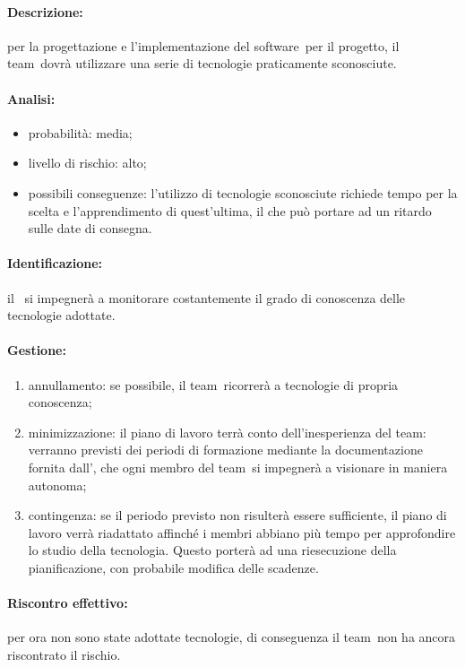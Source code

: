 \documentclass[../PianoProgetto.tex]{subfiles}
\begin{document}
	\paragraph*{Descrizione:} per la progettazione e l'implementazione del software\g\ per il progetto, il team\g\ dovrà utilizzare una serie di tecnologie praticamente sconosciute.
	
	\paragraph*{Analisi:}
	\begin{itemize}
		\item probabilità: media;
		\item livello di rischio: alto;
		\item possibili conseguenze: l'utilizzo di tecnologie sconosciute richiede tempo per la scelta e l'apprendimento di quest'ultima, il che può portare ad un ritardo sulle date di consegna.
	\end{itemize}
	
	\paragraph*{Identificazione:} il \responsabilediprogetto\ si impegnerà a monitorare costantemente il grado di conoscenza delle tecnologie adottate.
	
	\paragraph*{Gestione:}
	\begin{enumerate}
		\item annullamento: se possibile, il team\g\ ricorrerà a tecnologie di propria conoscenza;
		\item minimizzazione: il piano di lavoro terrà conto dell'inesperienza del team\g : verranno previsti dei periodi di formazione mediante la documentazione fornita dall'\amministratore , che ogni membro del team\g\ si impegnerà a visionare in maniera autonoma;
		\item contingenza: se il periodo previsto non risulterà essere sufficiente, il piano di lavoro verrà riadattato affinché i membri abbiano più tempo per approfondire lo studio della tecnologia. Questo porterà ad una riesecuzione della pianificazione, con probabile modifica delle scadenze.
	\end{enumerate} 
	
	\paragraph*{Riscontro effettivo:} per ora non sono state adottate tecnologie, di conseguenza il team\g\ non ha ancora riscontrato il rischio.
\end{document}

